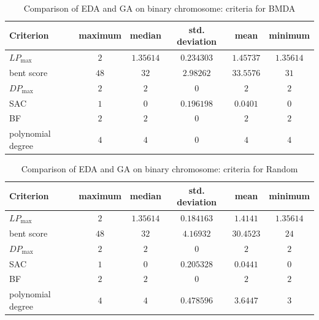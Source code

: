 \begin{table}[tb]
\begin{center}
\begin{tabular}{| l | c | c | c | c | c |}
\hline
Criterion & maximum & median & std. deviation & mean & minimum \\ \hline
$LP_{\max}$ & $2$ & $1.35614$ & $0.234303$ & $1.45737$ & $1.35614$ \\ \hline
bent score & $48$ & $32$ & $2.98262$ & $33.5576$ & $31$ \\ \hline
$DP_{\max}$ & $2$ & $2$ & $0$ & $2$ & $2$ \\ \hline
SAC & $1$ & $0$ & $0.196198$ & $0.0401$ & $0$ \\ \hline
BF & $2$ & $2$ & $0$ & $2$ & $2$ \\ \hline
polynomial degree & $4$ & $4$ & $0$ & $4$ & $4$ \\ \hline
\end{tabular}
\caption{Comparison of EDA and GA on binary chromosome: criteria for BMDA}
\label{tabBMDAGaVsEDAComparison}
\end{center}
\end{table}
\nopagebreak
\begin{table}[tb]
\begin{center}
\begin{tabular}{| l | c | c | c | c | c |}
\hline
Criterion & maximum & median & std. deviation & mean & minimum \\ \hline
$LP_{\max}$& $2$ & $1.35614$ & $0.184163$ & $1.4141$ & $1.35614$ \\ \hline
bent score & $48$ & $32$ & $4.16932$ & $30.4523$ & $24$ \\ \hline
$DP_{\max}$ & $2$ & $2$ & $0$ & $2$ & $2$ \\ \hline
SAC & $1$ & $0$ & $0.205328$ & $0.0441$ & $0$ \\ \hline
BF & $2$ & $2$ & $0$ & $2$ & $2$ \\ \hline
polynomial degree & $4$ & $4$ & $0.478596$ & $3.6447$ & $3$ \\ \hline
\end{tabular}
\caption{Comparison of EDA and GA on binary chromosome: criteria for Random}
\label{tabRandomGaVsEDAComparison}
\end{center}
\end{table}


